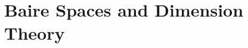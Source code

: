 \documentclass[../main.tex]{subfiles}
\begin{document}
\chapter{Baire Spaces and Dimension Theory}
%
\todo{}
\end{document}
